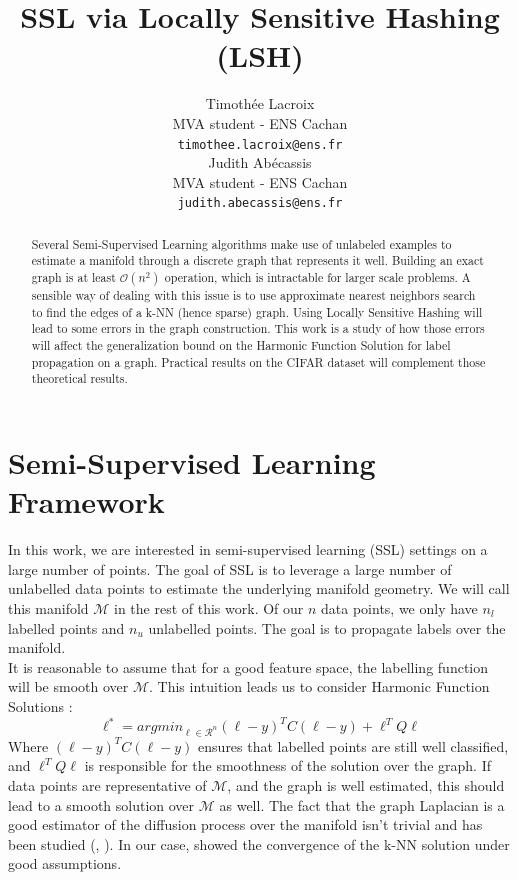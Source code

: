 \documentclass{article} %
\title{SSL via Locally Sensitive Hashing (LSH)}
\author{
Timothée Lacroix \\
MVA student - ENS Cachan\\
\texttt{timothee.lacroix@ens.fr} \\
\And
Judith Abécassis \\
MVA student - ENS Cachan \\
\texttt{judith.abecassis@ens.fr} \\
}
\begin{document}
\maketitle

\begin{abstract}
Several Semi-Supervised Learning algorithms make use of unlabeled examples to estimate a manifold through a discrete graph that represents it well. Building an exact graph is at least $\mathcal{O}(n^2)$ operation, which is intractable for larger scale problems. A sensible way of dealing with this issue is to use approximate nearest neighbors search to find the edges of a k-NN (hence sparse) graph. Using Locally Sensitive Hashing will lead to some errors in the graph construction. This work is a study of how those errors will affect the generalization bound on the Harmonic Function Solution for label propagation on a graph. Practical results on the CIFAR dataset will complement those theoretical results.
\end{abstract}


\section{Semi-Supervised Learning Framework}

In this work, we are interested in semi-supervised learning (SSL) settings on a large number of points. The goal of SSL is to leverage a large number of unlabelled data points to estimate the underlying manifold geometry. We will call this manifold $\mathcal{M}$ in the rest of this work. Of our $n$ data points, we only have $n_l$ labelled points and $n_u$ unlabelled points. The goal is to propagate labels over the manifold.\\

It is reasonable to assume that for a good feature space, the labelling function will be smooth over $\mathcal{M}$. This intuition leads us to consider Harmonic Function Solutions : 
$$\ell^* = argmin_{\ell \in \mathcal{R}^n} (\ell-y)^TC(\ell-y) + \ell^TQ\ell$$
Where $(\ell-y)^TC(\ell-y)$ ensures that labelled points are still well classified, and $\ell^TQ\ell$ is responsible for the smoothness of the solution over the graph. If data points are representative of $\mathcal{M}$, and the graph is well estimated, this should lead to a smooth solution over $\mathcal{M}$ as well. The fact that the graph Laplacian is a good estimator of the diffusion process over the manifold isn't trivial and has been studied (\cite{ting2011analysis}, \cite{hein2006graph}). In our case, \cite{ting2011analysis} showed the convergence of the k-NN solution under good assumptions.
\end{document}

